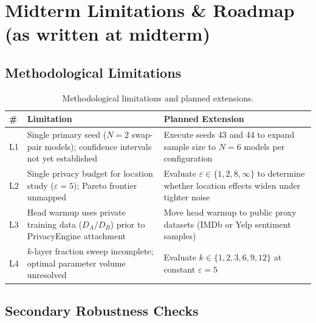 \documentclass[11pt,a4paper]{article}
\begin{document}
\section{Midterm Limitations \& Roadmap (as written at midterm)}

\subsection{Methodological Limitations}

\begin{table}[htbp]
\centering
\caption{Methodological limitations and planned extensions.}
\label{tab:limitations_crit}
\setlength{\tabcolsep}{5pt}
\begin{tabularx}{\textwidth}{@{}C{0.55cm} >{\RaggedRight\arraybackslash}X >{\RaggedRight\arraybackslash}X @{}}
\toprule
\textbf{\#} & \textbf{Limitation} & \textbf{Planned Extension} \\
\midrule
L1 & Single primary seed ($N{=}2$ swap-pair models); confidence intervals not yet established &
     Execute seeds 43 and 44 to expand sample size to $N{=}6$ models per configuration \\
L2 & Single privacy budget for location study ($\varepsilon{=}5$); Pareto frontier unmapped &
     Evaluate $\varepsilon \in \{1, 2, 8, \infty\}$ to determine whether location effects widen under tighter noise \\
L3 & Head warmup uses private training data ($D_A/D_B$) prior to PrivacyEngine attachment &
     Move head warmup to public proxy datasets (IMDb or Yelp sentiment samples) \\
L4 & $k$-layer fraction sweep incomplete; optimal parameter volume unresolved &
     Evaluate $k \in \{1, 2, 3, 6, 9, 12\}$ at constant $\varepsilon = 5$ \\
\bottomrule
\end{tabularx}
\end{table}

\subsection{Secondary Robustness Checks}
\end{document}
